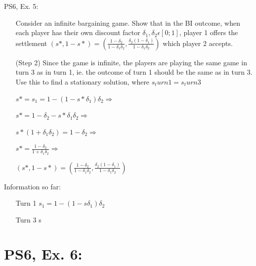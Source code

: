 \begin{frame}{PS6, Ex. 5: }
    \begin{itemize}
    \item[] Consider an infinite bargaining game. Show that in the BI outcome, when each player has their own discount factor $\delta_1,\delta_2 \epsilon [0;1]$, player 1 offers the settlement $ (s*,1-s*)= \left( \frac{1-\delta_2}{1-\delta_1\delta_2},\frac{\delta_2(1-\delta_1)}{1-\delta_1\delta_2}\right)$ which player 2 accepts.
    \item[(Step 2)] Since the game is infinite, the players are playing the same game in turn 3 as in turn 1, ie. the outcome of turn 1 should be the same as in turn 3. Use this to find a stationary solution, where $s_turn1=s_turn3$
    \end{itemize}
    \vfill\null
  \begin{multicols}{2}
    \begin{itemize}
        \item[] $s*=s_1 = 1- (1-s*\delta_1)\delta_2 \Rightarrow$
        \item[] $s*= 1-\delta_2-s*\delta_1\delta_2 \Rightarrow$
        \item[] $s*(1+\delta_1\delta_2)= 1-\delta_2 \Rightarrow$
        \item[] $s*= \frac{1-\delta_2}{1+\delta_1\delta_2} \Rightarrow$
        \item[] $ (s*,1-s*)= \left( \frac{1-\delta_2}{1-\delta_1\delta_2},\frac{\delta_2(1-\delta_1)}{1-\delta_1\delta_2}\right)$
    \end{itemize}
    \vfill\null \columnbreak
    Information so far:
    \begin{itemize}
    \item[Turn 1] $s_1 = 1- (1-s\delta_1)\delta_2$\\
    \item[Turn 3] s\\
    \end{itemize}
    \vfill\null 
  \end{multicols}
    \vfill\null 
\end{frame}

\section{PS6, Ex. 6: }


